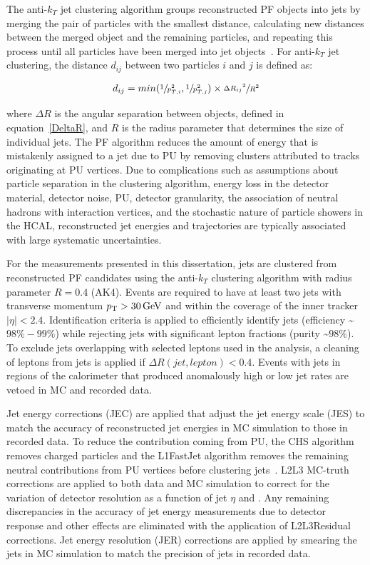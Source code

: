 The anti-$k_T$ jet clustering algorithm groups reconstructed PF objects into jets by merging the pair of particles with the smallest distance, calculating new distances between the merged object and the remaining particles, and repeating this process until all particles have been merged into jet objects~\cite{Matteo_Cacciari_2008}.
For anti-$k_T$ jet clustering, the distance $d_{ij}$ between two particles $i$ and $j$ is defined as:
\begin{linenomath*}
\begin{align}
d_{ij} = min(\sfrac{1}{p_{T,i}^2}, \sfrac{1}{p_{T,j}^2}) \times \sfrac{{\Delta R_{ij}}^2}{R^2}
\end{align}
\end{linenomath*}
where $\Delta R$ is the angular separation between objects, defined in equation~\ref{DeltaR}, and $R$ is the radius parameter that determines the size of individual jets.
The PF algorithm reduces the amount of energy that is mistakenly assigned to a jet due to PU by removing clusters attributed to tracks originating at PU vertices.
Due to complications such as assumptions about particle separation in the clustering algorithm, energy loss in the detector material, detector noise, PU, detector granularity, the association of neutral hadrons with interaction vertices, and the stochastic nature of particle showers in the HCAL, reconstructed jet energies and trajectories are typically associated with large systematic uncertainties.

For the measurements presented in this dissertation, jets are clustered from reconstructed PF candidates using the anti-$k_T$ clustering algorithm with radius parameter $R = 0.4$ (AK4).
Events are required to have at least two jets with transverse momentum $\pT > \SI{30}{\GeV}$ and within the coverage of the inner tracker $\vert \eta \vert < 2.4$. 
Identification criteria is applied to efficiently identify jets (efficiency \sim $98\% - 99\%$) while rejecting jets with significant lepton fractions (purity \sim $98\%$).
To exclude jets overlapping with selected leptons used in the analysis, a cleaning of leptons from jets is applied if $\Delta R(jet,lepton)<0.4$.
Events with jets in regions of the calorimeter that produced anomalously high or low jet rates are vetoed in MC and recorded data.

Jet energy corrections (JEC) are applied that adjust the jet energy scale (JES) to match the accuracy of reconstructed jet energies in MC simulation to those in recorded data.
To reduce the contribution coming from PU, the CHS algorithm removes charged particles and the L1FastJet algorithm removes the remaining neutral contributions from PU vertices before clustering jets~\cite{bib:JME18001}.
L2L3 MC-truth corrections are applied to both data and MC simulation to correct for the variation of detector resolution as a function of jet $\eta$ and \pT.
Any remaining discrepancies in the accuracy of jet energy measurements due to detector response and other effects are eliminated with the application of L2L3Residual corrections.
Jet energy resolution (JER) corrections are applied by smearing the jets in MC simulation to match the precision of jets in recorded data.

